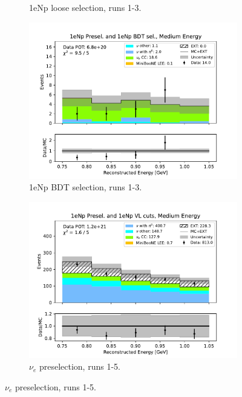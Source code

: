 \begin{figure}[H]
\begin{subfigure}{0.33\linewidth}
        \caption{1eNp loose selection, runs 1-3.}
    \end{subfigure}%
    \begin{subfigure}{0.33\linewidth}
        \includegraphics[width=\linewidth]{technote/Sidebands/Figures/NearSideband/near_sideband_reco_e_run123_NP_NPBDT_MEDIUM_ENERGY.pdf}
        \caption{1eNp BDT selection, runs 1-3.}
    \end{subfigure}
    \begin{subfigure}{0.33\linewidth}
        \includegraphics[width=\linewidth]{technote/Sidebands/Figures/NearSideband/near_sideband_reco_e_run1234a4b4c4d5_NP_NP_MEDIUM_ENERGY.pdf}
        \caption{$\nu_e$ preselection, runs 1-5.}
    \end{subfigure}%

\end{figure}
